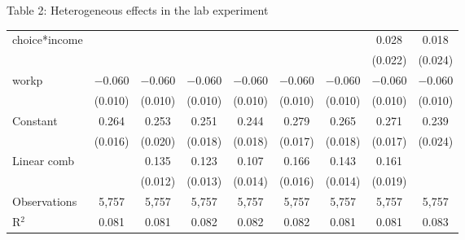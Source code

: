 \documentclass{beamer}
\begin{document}
\begin{frame}{Table 2: Heterogeneous effects in the lab experiment}
\begin{block}
\begin{table}[!htbp]
\begin{tabular}{@{\extracolsep{0pt}}lcccccccc}
	choice*income &  &  &  &  &  &  & 0.028 & 0.018 \\ 
	&  &  &  &  &  &  & (0.022) & (0.024) \\ 
	workp & $-$0.060 & $-$0.060 & $-$0.060 & $-$0.060 & $-$0.060 & $-$0.060 & $-$0.060 & $-$0.060 \\ 
	& (0.010) & (0.010) & (0.010) & (0.010) & (0.010) & (0.010) & (0.010) & (0.010) \\ 
	Constant & 0.264 & 0.253 & 0.251 & 0.244 & 0.279 & 0.265 & 0.271 & 0.239 \\ 
	& (0.016) & (0.020) & (0.018) & (0.018) & (0.017) & (0.018) & (0.017) & (0.024) \\ 
	Linear comb &   & 0.135 & 0.123 & 0.107 & 0.166 & 0.143 & 0.161 &  \\ 
	&  & (0.012) & (0.013) & (0.014) & (0.016) & (0.014) & (0.019) &  \\ 
	Observations & 5,757 & 5,757 & 5,757 & 5,757 & 5,757 & 5,757 & 5,757 & 5,757 \\ 
	R$^{2}$ & 0.081 & 0.081 & 0.082 & 0.082 & 0.082 & 0.081 & 0.081 & 0.083 \\ 
			\end{tabular} 
		\end{table}  
	\end{block}
	
\end{frame}
\end{document}

